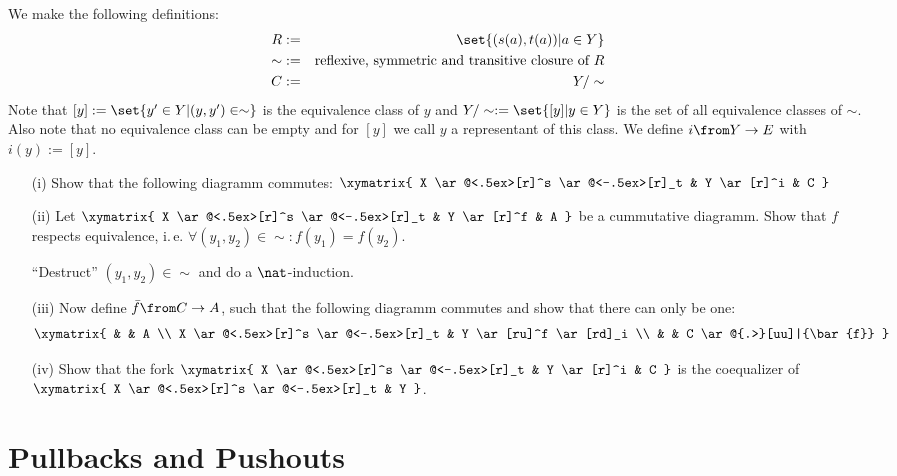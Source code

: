\begin{exercise}
\begin{itemize}
      We make the following definitions:
      \begin{alignat*}{2}
        R    &:=& \set{(s(a), t(a)) | a\in Y} \\
        \sim &:=& \text{reflexive, symmetric and transitive closure of $R$} \\
        C    &:=& Y / \sim
      \end{alignat*}
      Note that $[y] := \set{ y' \in Y | (y, y') \in \sim}$ is the equivalence class of $y$ and $Y / \sim := \set{ [y] | y \in Y}$ is the set of all equivalence classes of $\sim$.
      Also note that no equivalence class can be empty and for $[y]$ we call $y$ a representant of this class.
      We define $i \from Y \to E$ with $i(y) := [y]$.
      \begin{itemize}
        \item[(i)]Show that the following diagramm commutes:
          $\xymatrix{
            X \ar@<.5ex>[r]^s \ar@<-.5ex>[r]_t & Y \ar[r]^i & C
          }$
        \item[(ii)]Let
          $\xymatrix{
            X \ar@<.5ex>[r]^s \ar@<-.5ex>[r]_t & Y \ar[r]^f & A
          }$
          be a cummutative diagramm. Show that $f$ respects equivalence, i.\,e. $\forall (y_1, y_2) \in \sim: f(y_1) = f(y_2)$.
          \begin{hint}
            ``Destruct'' $(y_1, y_2) \in \sim$ and do a $\nat$-induction.
          \end{hint}
        \item[(iii)]Now define $\bar{f} \from C \to A$, such that the following diagramm commutes and show that there can only be one:
          \[ \xymatrix{
            & & A  \\
            X \ar@<.5ex>[r]^s \ar@<-.5ex>[r]_t & Y \ar[ru]^f \ar[rd]_i \\
            & & C \ar@{.>}[uu]|{\bar{f}}
          } \]
        \item[(iv)]Show that the fork
          $\xymatrix{
            X \ar@<.5ex>[r]^s \ar@<-.5ex>[r]_t & Y \ar[r]^i & C
          }$
          is the coequalizer of
          $\xymatrix{
            X \ar@<.5ex>[r]^s \ar@<-.5ex>[r]_t & Y
          }$.
      \end{itemize}
  \end{itemize}
\end{exercise}

\section{Pullbacks and Pushouts}

